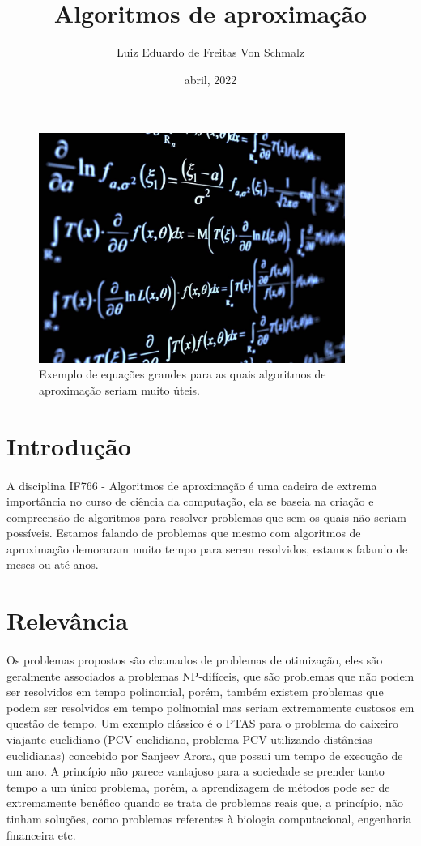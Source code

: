 \documentclass[a4paper,10pt]{article}
\title{Algoritmos de aproximação}
\author{Luiz Eduardo de Freitas Von Schmalz}
\date{abril, 2022}
\begin{document}
\maketitle
\begin{figure}[h!]
\centering
    \includegraphics[width=100mm]{equacao3.jpg}
    \caption{Exemplo de equações grandes para as quais algoritmos de aproximação seriam muito úteis.}
\end{figure}
\section{Introdução}
\paragraph{}
    A disciplina IF766 - Algoritmos de aproximação é uma cadeira de extrema importância no curso de ciência da computação, ela se baseia na criação e compreensão de algoritmos para resolver problemas que sem os quais não seriam possíveis. Estamos falando de problemas que mesmo com algoritmos de aproximação demoraram muito tempo para serem resolvidos, estamos falando de meses ou até anos. \cite{algowiki}
    
\section{Relevância}
\paragraph{}
    Os problemas propostos são chamados de problemas de otimização, eles são geralmente associados a problemas NP-difíceis\cite{Npdificil}, que são problemas que não podem ser resolvidos em tempo polinomial, porém, também existem problemas que podem ser resolvidos em tempo polinomial mas seriam extremamente custosos em questão de tempo. Um exemplo clássico é o PTAS para o problema do caixeiro viajante euclidiano (PCV euclidiano, problema PCV utilizando distâncias euclidianas) concebido por Sanjeev Arora, que possui um tempo de execução de um ano. A princípio não parece vantajoso para a sociedade se prender tanto tempo a um único problema, porém, a aprendizagem de métodos pode ser de extremamente benéfico quando se trata de problemas reais que, a princípio, não tinham soluções, como problemas referentes à biologia computacional, engenharia financeira etc. 
    
\end{document}
